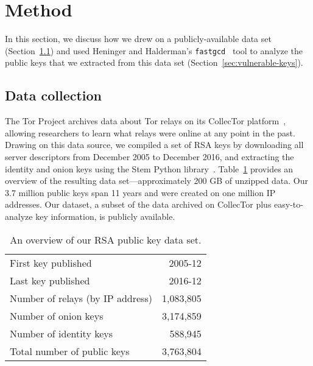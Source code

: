 \section{Method}
\label{sec:method}
In this section, we discuss how we drew on a publicly-available data set
(Section~\ref{sec:data-collection}) and used Heninger and Halderman's 
\texttt{fastgcd}~\cite{fastgcd} tool to analyze the public keys that 
we extracted from this data set (Section~\ref{sec:vulnerable-keys}).

\subsection{Data collection}
\label{sec:data-collection}
The Tor Project archives data about Tor relays on its CollecTor
platform~\cite{collector}, allowing researchers to learn what relays were online
at any point in the past.  Drawing on this data source, we compiled a set of RSA
keys by downloading all server descriptors from December 2005 to December 2016,
and extracting the identity and onion keys using the Stem Python
library~\cite{stem}.  Table~\ref{tab:dataset} provides an overview of the
resulting data set---approximately 200 GB of unzipped data.  Our 3.7 million
public keys span 11 years and were created on one million IP addresses.
Our dataset, a subset of the data archived on CollecTor plus
easy-to-analyze key information, is publicly available.

\begin{table}[t]
	\centering
	\begin{tabular}{l r}
	\toprule

	First key published & 2005-12 \\
	Last key published & 2016-12 \\

	\midrule

	Number of relays (by IP address) & 1,083,805 \\
	Number of onion keys & 3,174,859 \\
	Number of identity keys & 588,945 \\
	Total number of public keys & 3,763,804 \\

	\bottomrule
	\end{tabular}
	\caption{An overview of our RSA public key data set.}
	\label{tab:dataset}
\end{table}

